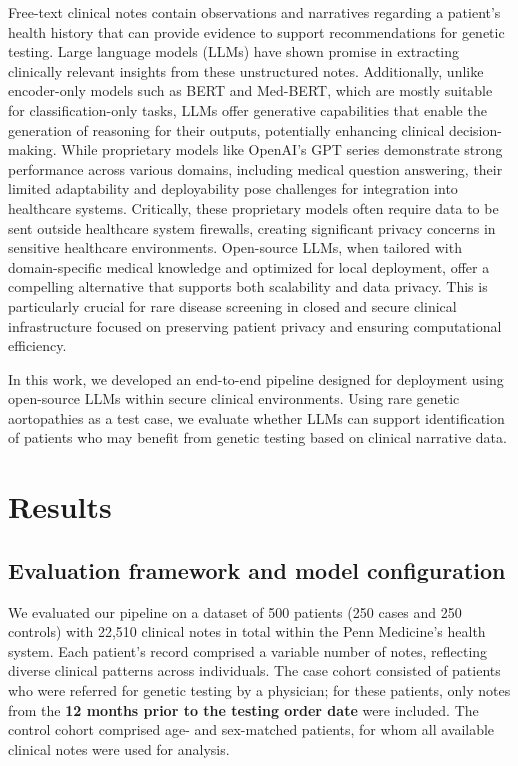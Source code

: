 \documentclass[fleqn,10pt]{wlscirep}
\begin{document}
Free-text clinical notes contain observations and narratives regarding a patient’s health history that can provide evidence to support recommendations for genetic testing. Large language models (LLMs) have shown promise in extracting clinically relevant insights from these unstructured notes.\cite{clusmann2023future,behari2024decision,thirunavukarasu2023large,huang2024critical} Additionally, unlike encoder-only models such as BERT and Med-BERT,\cite{devlin2019bert,rasmy2021med} which are mostly suitable for classification-only tasks, LLMs offer generative capabilities that enable the generation of reasoning for their outputs, potentially enhancing clinical decision-making. While proprietary models like OpenAI’s GPT series demonstrate strong performance across various domains, including medical question answering, their limited adaptability and deployability pose challenges for integration into healthcare systems. Critically, these proprietary models often require data to be sent outside healthcare system firewalls, creating significant privacy concerns in sensitive healthcare environments. Open-source LLMs, when tailored with domain-specific medical knowledge and optimized for local deployment, offer a compelling alternative that supports both scalability and data privacy. This is particularly crucial for rare disease screening in closed and secure clinical infrastructure focused on preserving patient privacy and ensuring computational efficiency.

In this work, we developed an end-to-end pipeline designed for deployment using open-source LLMs within secure clinical environments. Using rare genetic aortopathies as a test case, we evaluate whether LLMs can support identification of patients who may benefit from genetic testing based on clinical narrative data.



\section*{Results}

\subsection*{Evaluation framework and model configuration}
We evaluated our pipeline on a dataset of 500 patients (250 cases and 250 controls) with 22,510 clinical notes in total within the Penn Medicine's health system. Each patient’s record comprised a variable number of notes, reflecting diverse clinical patterns across individuals. The case cohort consisted of patients who were referred for genetic testing by a physician; for these patients, only notes from the \textbf{12 months prior to the testing order date} were included. The control cohort comprised age- and sex-matched patients, for whom all available clinical notes were used for analysis.
\end{document}
